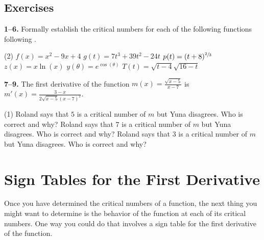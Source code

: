 \documentclass[10pt,oneside,]{book}
\theoremstyle{plain}
\theoremstyle{definition}
\numberwithin{equation}{section}
\newcommand{\fe}[2]{#1\mathopen{}\left(#2\right)\mathclose{}}
\newcommand{\fd}[1]{#1'}
\begin{document}
\subsection[Exercises]{Exercises}\label{exercises-57}
\textbf{1--6. }\hypertarget{exercisegroup-111}{\null}Formally establish the critical numbers for each of the following functions following .%
\par
\begin{exercisegroup}(2)
\exercise[1.]\hypertarget{exercise-573}{\null}\(\fe{f}{x}=x^2-9x+4\)%
\exercise[2.]\hypertarget{exercise-574}{\null}\(\fe{g}{t}=7t^3+39t^2-24t\)%
\exercise[3.]\hypertarget{exercise-575}{\null}\(\fe{p}{t}=(t+8)^{\sfrac{2}{3}}\)%
\exercise[4.]\hypertarget{exercise-576}{\null}\(\fe{z}{x}=x\fe{\ln}{x}\)%
\exercise[5.]\hypertarget{exercise-577}{\null}\(\fe{y}{\theta}=e^{\fe{\cos}{\theta}}\)%
\exercise[6.]\hypertarget{exercise-578}{\null}\(\fe{T}{t}=\sqrt{t-4}\sqrt{16-t}\)%
\end{exercisegroup}
\par\smallskip\noindent
\textbf{7--9. }\hypertarget{exercisegroup-112}{\null}The first derivative of the function \(\fe{m}{x}=\frac{\sqrt{x-5}}{x-7}\) is \(\fe{\fd{m}}{x}=\frac{3-x}{2\sqrt{x-5}(x-7)^2}\).%
\par
\begin{exercisegroup}(1)
\exercise[7.]\hypertarget{exercise-579}{\null}Roland says that \(5\) is a critical number of \(m\) but Yuna disagrees.  Who is correct and why?%
\exercise[8.]\hypertarget{exercise-580}{\null}Roland says that \(7\) is a critical number of \(m\) but Yuna disagrees.  Who is correct and why?%
\exercise[9.]\hypertarget{exercise-581}{\null}Roland says that \(3\) is a critical number of \(m\) but Yuna disagrees.  Who is correct and why?%
\end{exercisegroup}
\par\smallskip\noindent
\typeout{************************************************}
\typeout{************************************************}
\section[Sign Tables]{Sign Tables for the First Derivative}\label{section-sign-tables-for-the-first-derivative}
Once you have determined the critical numbers of a function, the next thing you might want to determine is the behavior of the function at each of its critical numbers.  One way you could do that involves a sign table for the first derivative of the function.%
\typeout{************************************************}
\typeout{************************************************}
\end{document}
